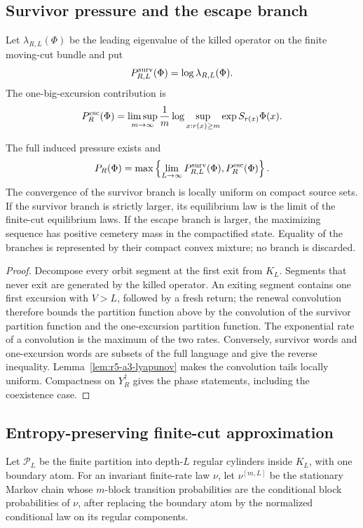\subsection{Survivor pressure and the escape branch}

Let \(\lambda_{R,L}(\Phi)\) be the leading eigenvalue of the killed operator
on the finite moving-cut bundle and put
\[
 P_{R,L}^{\rm surv}(\Phi)=\log\lambda_{R,L}(\Phi).
\]
The one-big-excursion contribution is
\[
 P_R^{\rm esc}(\Phi)
 =\limsup_{m\to\infty}\frac1m
   \log\sup_{x:r(x)\ge m}
   \exp S_{r(x)}\Phi(x).
\]

\begin{theorem}
\label{thm:r5-a3-pressure}
The full induced pressure exists and
\[
 P_R(\Phi)
 =\max\left\{
 \lim_{L\to\infty}P_{R,L}^{\rm surv}(\Phi),
 P_R^{\rm esc}(\Phi)
 \right\}.
\]
The convergence of the survivor branch is locally uniform on compact source
sets.  If the survivor branch is strictly larger, its equilibrium law is the
limit of the finite-cut equilibrium laws.  If the escape branch is larger,
the maximizing sequence has positive cemetery mass in the compactified
state.  Equality of the branches is represented by their compact convex
mixture; no branch is discarded.
\end{theorem}

\begin{proof}
Decompose every orbit segment at the first exit from \(K_L\).  Segments that
never exit are generated by the killed operator.  An exiting segment contains
one first excursion with \(V>L\), followed by a fresh return; the renewal
convolution therefore bounds the partition function above by the convolution
of the survivor partition function and the one-excursion partition function.
The exponential rate of a convolution is the maximum of the two rates.
Conversely, survivor words and one-excursion words are subsets of the full
language and give the reverse inequality.  Lemma~\ref{lem:r5-a3-lyapunov}
makes the convolution tails locally uniform.  Compactness on
\(Y_R^\dagger\) gives the phase statements, including the coexistence case.
\end{proof}

\subsection{Entropy-preserving finite-cut approximation}

Let \({\mathcal P}_L\) be the finite partition into depth-\(L\) regular
cylinders inside \(K_L\), with one boundary atom.  For an invariant finite-rate
law \(\nu\), let \(\nu^{[m,L]}\) be the stationary Markov chain whose
\(m\)-block transition probabilities are the conditional block probabilities
of \(\nu\), after replacing the boundary atom by the normalized conditional
law on its regular components.

